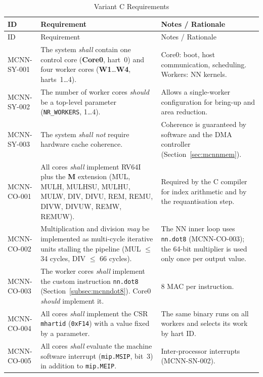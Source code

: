 \begin{longtable}{|p{} |p{} |p{}|}
\caption{Variant C Requirements}
\label{tab:mcnnReq}\\
  \hline
  ID & Requirement & Notes / Rationale \\
  \hline
  \hline
\endfirsthead
  \hline
  ID & Requirement & Notes / Rationale \\
  \hline
  \hline
\endhead
  MCNN-SY-001 &
    The system \textit{shall} contain one control core (\textbf{Core0},
    hart~0) and four worker cores (\textbf{W1}\ldots\textbf{W4},
    harts~1\ldots4). &
    Core0: boot, host communication, scheduling.
    Workers: NN kernels. \\
  \hline
  MCNN-SY-002 &
    The number of worker cores \textit{should} be a top-level parameter
    (\texttt{NR\_WORKERS}, 1\ldots4). &
    Allows a single-worker configuration for bring-up and area reduction. \\
  \hline
  MCNN-SY-003 &
    The system \textit{shall not} require hardware cache coherence. &
    Coherence is guaranteed by software and the DMA controller
    (Section~\ref{sec:mcnnmem}). \\
  \hline
  MCNN-CO-001 &
    All cores \textit{shall} implement RV64I plus the
    \textbf{M} extension (MUL, MULH, MULHSU, MULHU, MULW, DIV, DIVU, REM,
    REMU, DIVW, DIVUW, REMW, REMUW). &
    Required by the C compiler for index arithmetic and by the
    requantisation step. \\
  \hline
  MCNN-CO-002 &
    Multiplication and division \textit{may} be implemented as multi-cycle
    iterative units stalling the pipeline
    (MUL $\leq$ 34 cycles, DIV $\leq$ 66 cycles). &
    The NN inner loop uses \texttt{nn.dot8} (MCNN-CO-003); the 64-bit
    multiplier is used only once per output value. \\
  \hline
  MCNN-CO-003 &
    The worker cores \textit{shall} implement the custom instruction
    \texttt{nn.dot8} (Section~\ref{subsec:mcnndot8}). Core0
    \textit{should} implement it. &
    8 MAC per instruction. \\
  \hline
  MCNN-CO-004 &
    All cores \textit{shall} implement the CSR \texttt{mhartid}
    (\texttt{0xF14}) with a value fixed by a parameter. &
    The same binary runs on all workers and selects its work by hart ID. \\
  \hline
  MCNN-CO-005 &
    All cores \textit{shall} evaluate the machine software interrupt
    (\texttt{mip.MSIP}, bit~3) in addition to \texttt{mip.MEIP}. &
    Inter-processor interrupts (MCNN-SN-002).

\end{longtable}
